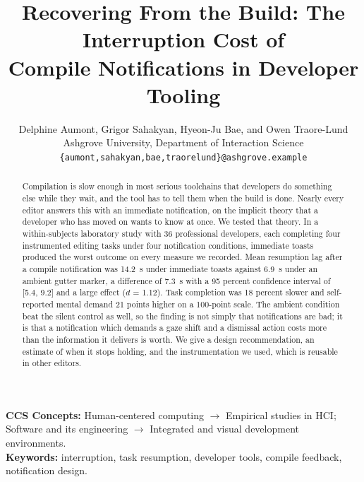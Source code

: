 \documentclass[10pt,twocolumn]{article}
\title{\vspace{-8mm}\bfseries\large
Recovering From the Build: The Interruption Cost of\\
Compile Notifications in Developer Tooling}
\author{
  \normalsize Delphine Aumont, Grigor Sahakyan, Hyeon-Ju Bae, and Owen Traore-Lund\\[1mm]
  \footnotesize Ashgrove University, Department of Interaction Science\\
  \footnotesize \texttt{\{aumont,sahakyan,bae,traorelund\}@ashgrove.example}
}
\date{}
\newcommand{\cohensd}{\ensuremath{d}}
\begin{document}
\maketitle

\begin{abstract}
\noindent
\footnotesize
Compilation is slow enough in most serious toolchains that developers do
something else while they wait, and the tool has to tell them when the build is
done. Nearly every editor answers this with an immediate notification, on the
implicit theory that a developer who has moved on wants to know at once. We
tested that theory. In a within-subjects laboratory study with 36 professional
developers, each completing four instrumented editing tasks under four
notification conditions, immediate toasts produced the worst outcome on every
measure we recorded. Mean resumption lag after a compile notification was
14.2~s under immediate toasts against 6.9~s under an ambient gutter marker, a
difference of 7.3~s with a 95 percent confidence interval of [5.4, 9.2] and a
large effect (\cohensd{} = 1.12). Task completion was 18 percent slower and
self-reported mental demand 21 points higher on a 100-point scale. The ambient
condition beat the silent control as well, so the finding is not simply that
notifications are bad; it is that a notification which demands a gaze shift and
a dismissal action costs more than the information it delivers is worth. We
give a design recommendation, an estimate of when it stops holding, and the
instrumentation we used, which is reusable in other editors.
\end{abstract}

\vspace{2mm}
{\footnotesize \noindent
\textbf{CCS Concepts:} Human-centered computing $\rightarrow$ Empirical studies
in HCI; Software and its engineering $\rightarrow$ Integrated and visual
development environments.\\[1mm]
\textbf{Keywords:} interruption, task resumption, developer tools, compile
feedback, notification design.}

\vspace{3mm}











\end{document}
